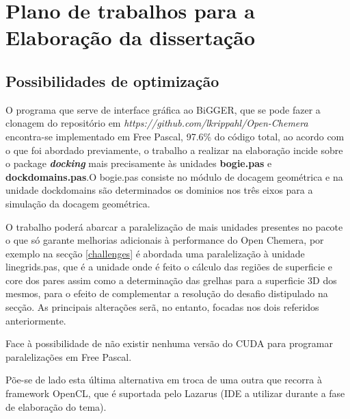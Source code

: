 \chapter{Plano de trabalhos para a Elaboração da dissertação}
\label{cha3}

%


\section{Possibilidades de optimização} %
\label{abordagem}
O programa que serve de interface gráfica ao BiGGER, que se pode fazer a clonagem do repositório em \textit{https://github.com/lkrippahl/Open-Chemera} encontra-se implementado em Free Pascal, 97.6\% do código total, ao acordo com o que foi abordado previamente, o trabalho a realizar na elaboração incide sobre o package \textbf{\textit{docking}} mais precisamente às unidades \textbf{bogie.pas} e \textbf{dockdomains.pas}.O bogie.pas consiste no módulo de docagem geométrica  e na unidade dockdomains são determinados os dominios nos três eixos para a simulação da docagem geométrica.

 O trabalho poderá abarcar a paralelização de mais unidades presentes no pacote o que só garante melhorias adicionais à performance do Open Chemera, por exemplo na secção \ref{challenges} é abordada uma paralelização à unidade linegrids.pas, que é a unidade onde é feito o cálculo das regiões de superficie e core dos pares assim como a determinação das grelhas para a superficie 3D dos mesmos, para o efeito de complementar a resolução do desafio distipulado na secção. As principais alterações serã, no entanto, focadas nos dois referidos anteriormente.
 
Face à possibilidade de não existir nenhuma versão do CUDA para programar paralelizações em Free Pascal. %

 Põe-se de lado esta última alternativa em troca de uma outra que recorra à framework OpenCL, que é suportada pelo Lazarus (IDE a utilizar durante a fase de elaboração do tema).
 
